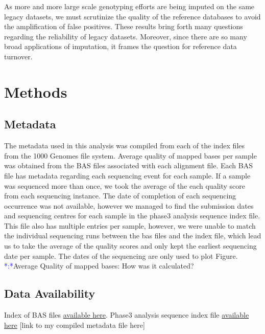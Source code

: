 \documentclass[12pt,twocolumn]{article}
\newcommand{\todo}[1]{\textcolor{blue}{*#1*}}
\begin{document}
As more and more large scale genotyping efforts are being imputed on the same legacy datasets, we must scrutinize the quality of the reference databases to avoid the amplification of false positives. 
These results bring forth many questions regarding the reliability of legacy datasets. 
Moreover, since there are so many broad applications of imputation, it frames the question for reference data turnover. 



\section{Methods}
\subsection{Metadata}
The metadata used in this analysis was compiled from each of the index files from the 1000 Genomes file system. 
Average quality of mapped bases per sample was obtained from the BAS files associated with each alignment file. 
Each BAS file has metadata regarding each sequencing event for each sample. 
If a sample was sequenced more than once, we took the average of the each quality score from each sequencing instance. 
The date of completion of each sequencing occurrence was not available, however we managed to find the submission dates and sequencing centres for each sample in the phase3 analysis sequence index file.  
This file also has multiple entries per sample, however, we were unable to match the individual sequencing runs between the bas files and the index file, which lead us to take the average of the quality scores and only kept the earliest sequencing date per sample. 
The dates of the sequencing are only used to plot Figure. \todo:{Average Quality of mapped bases: How was it calculated?}

\subsection{Data Availability}

Index of BAS files \href{http://ftp.1000genomes.ebi.ac.uk/vol1/ftp/data_collections/1000_genomes_project/1000genomes.low_coverage.GRCh38DH.alignment.index}{available here}.
Phase3 analysis sequence index file  \href{http://ftp.1000genomes.ebi.ac.uk/vol1/ftp/phase3/20130502.phase3.analysis.sequence.index}{available here} 
[link to my compiled metadata file here]
\end{document}
